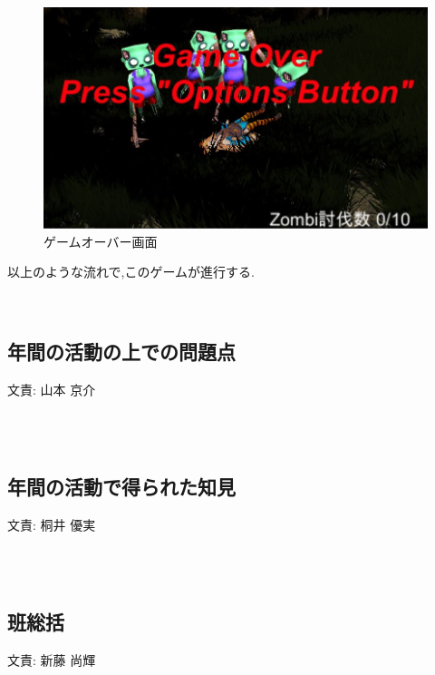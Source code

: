 \documentclass[a4paper]{jarticle}
\newcommand{\resp}[1]{\begin{flushright}文責: #1\end{flushright}~\\　}
\begin{document}
        \begin{figure}[h]
          \centering
          \includegraphics[keepaspectratio, scale=0.65]
               {images/Shindo/gameover.JPG}
          \caption{ゲームオーバー画面}
        \end{figure}
         
         以上のような流れで,このゲームが進行する.
        
        

　\subsection{年間の活動の上での問題点}
      \resp{山本 京介}
     
    \subsection{年間の活動で得られた知見}
      \resp{桐井 優実}

    \subsection{班総括}
      \resp{新藤 尚輝}
  
\end{document}
